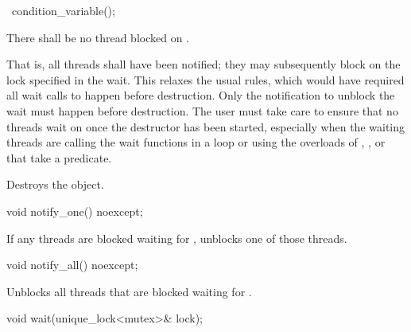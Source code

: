 %
\begin{itemdecl}
~condition_variable();
\end{itemdecl}

\begin{itemdescr}
\pnum
\requires There shall be no thread blocked on . \begin{note} That is, all
threads shall have been notified; they may subsequently block on the lock specified in the
wait.
This relaxes the usual rules, which would have required all wait calls to happen before
destruction. Only the notification to unblock the wait must happen before destruction.
The user must take care to ensure that no threads wait on  once the destructor has
been started, especially when the waiting threads are calling the wait functions in a loop or
using the overloads of , , or  that take a predicate.
\end{note}

\pnum\effects Destroys the object.
\end{itemdescr}

%
\begin{itemdecl}
void notify_one() noexcept;
\end{itemdecl}

\begin{itemdescr}
\pnum\effects If any threads are blocked waiting for , unblocks one of those threads.
\end{itemdescr}

%
\begin{itemdecl}
void notify_all() noexcept;
\end{itemdecl}

\begin{itemdescr}
\pnum\effects Unblocks all threads that are blocked waiting for .
\end{itemdescr}

%
\begin{itemdecl}
void wait(unique_lock<mutex>& lock);
\end{itemdecl}

